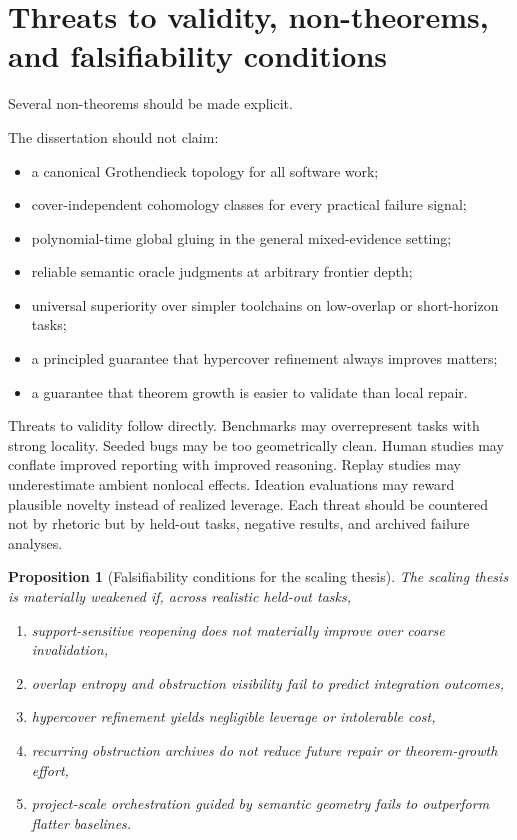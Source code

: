\documentclass[11pt]{report}
\newtheorem{proposition}[definition]{Proposition}
\begin{document}
\section{Threats to validity, non-theorems, and falsifiability conditions}
Several non-theorems should be made explicit.

The dissertation should not claim:
\begin{itemize}
\item a canonical Grothendieck topology for all software work;
\item cover-independent cohomology classes for every practical failure signal;
\item polynomial-time global gluing in the general mixed-evidence setting;
\item reliable semantic oracle judgments at arbitrary frontier depth;
\item universal superiority over simpler toolchains on low-overlap or short-horizon tasks;
\item a principled guarantee that hypercover refinement always improves matters;
\item a guarantee that theorem growth is easier to validate than local repair.
\end{itemize}

Threats to validity follow directly. Benchmarks may overrepresent tasks with strong locality. Seeded bugs may be too geometrically clean. Human studies may conflate improved reporting with improved reasoning. Replay studies may underestimate ambient nonlocal effects. Ideation evaluations may reward plausible novelty instead of realized leverage. Each threat should be countered not by rhetoric but by held-out tasks, negative results, and archived failure analyses.

\begin{proposition}[Falsifiability conditions for the scaling thesis]
The scaling thesis is materially weakened if, across realistic held-out tasks,
\begin{enumerate}[label=(\roman*)]
\item support-sensitive reopening does not materially improve over coarse invalidation,
\item overlap entropy and obstruction visibility fail to predict integration outcomes,
\item hypercover refinement yields negligible leverage or intolerable cost,
\item recurring obstruction archives do not reduce future repair or theorem-growth effort,
\item project-scale orchestration guided by semantic geometry fails to outperform flatter baselines.
\end{enumerate}
\end{proposition}
\end{document}
